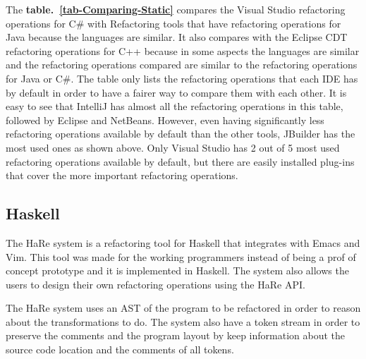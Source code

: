 The {\bf table.~\ref{tab-Comparing-Static}} compares the Visual Studio refactoring operations for C\# with Refactoring tools that have refactoring operations for Java because the languages are similar. It also compares with the Eclipse CDT  refactoring operations for C++ because in some aspects the languages are similar and the refactoring operations compared are similar to the refactoring operations for Java or C\#. 
The table only lists the refactoring operations that each IDE has by default in order to have a fairer way to compare them with each other.
It is easy to see that IntelliJ has almost all the refactoring operations in this table, followed by Eclipse and NetBeans.
However, even having significantly less refactoring operations available by default than the other tools, JBuilder has the most used ones as shown above.
Only Visual Studio has 2 out of 5 most used refactoring operations available by default, but there are easily installed plug-ins that cover the more important refactoring operations. 



\subsection{Haskell}

The HaRe  \cite{thompson2005refactoring} system is a refactoring tool for Haskell that integrates with Emacs and Vim.
This tool was made for the working programmers instead of being a prof of concept prototype and it is implemented in Haskell.
The system also allows the users to design their own refactoring operations using the HaRe API.

The HaRe system uses an AST of the program to be refactored in order to reason about the transformations to do.
The system also have a token stream in order to preserve the comments and the program layout by keep information about the source code location and the comments of all tokens.




